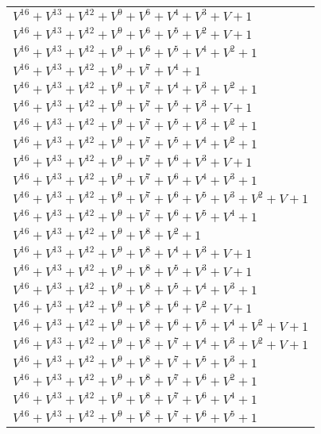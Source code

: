 \documentclass[12pt]{article}
\begin{document}
\begin{adjustwidth}{-4cm}{}
\begin{center}
\begin{longtable}{|l|}
$V^{16}  +V^{13}  +V^{12}  +V^{9}  +V^{6}  +V^{4}  +V^{3}  + V + 1$ \\
$V^{16}  +V^{13}  +V^{12}  +V^{9}  +V^{6}  +V^{5}  +V^{2}  + V + 1$ \\
$V^{16}  +V^{13}  +V^{12}  +V^{9}  +V^{6}  +V^{5}  +V^{4}  +V^{2}  + 1$ \\
$V^{16}  +V^{13}  +V^{12}  +V^{9}  +V^{7}  +V^{4}  + 1$ \\
$V^{16}  +V^{13}  +V^{12}  +V^{9}  +V^{7}  +V^{4}  +V^{3}  +V^{2}  + 1$ \\
$V^{16}  +V^{13}  +V^{12}  +V^{9}  +V^{7}  +V^{5}  +V^{3}  + V + 1$ \\
$V^{16}  +V^{13}  +V^{12}  +V^{9}  +V^{7}  +V^{5}  +V^{3}  +V^{2}  + 1$ \\
$V^{16}  +V^{13}  +V^{12}  +V^{9}  +V^{7}  +V^{5}  +V^{4}  +V^{2}  + 1$ \\
$V^{16}  +V^{13}  +V^{12}  +V^{9}  +V^{7}  +V^{6}  +V^{3}  + V + 1$ \\
$V^{16}  +V^{13}  +V^{12}  +V^{9}  +V^{7}  +V^{6}  +V^{4}  +V^{3}  + 1$ \\
$V^{16}  +V^{13}  +V^{12}  +V^{9}  +V^{7}  +V^{6}  +V^{5}  +V^{3}  +V^{2}  + V + 1$ \\
$V^{16}  +V^{13}  +V^{12}  +V^{9}  +V^{7}  +V^{6}  +V^{5}  +V^{4}  + 1$ \\
$V^{16}  +V^{13}  +V^{12}  +V^{9}  +V^{8}  +V^{2}  + 1$ \\
$V^{16}  +V^{13}  +V^{12}  +V^{9}  +V^{8}  +V^{4}  +V^{3}  + V + 1$ \\
$V^{16}  +V^{13}  +V^{12}  +V^{9}  +V^{8}  +V^{5}  +V^{3}  + V + 1$ \\
$V^{16}  +V^{13}  +V^{12}  +V^{9}  +V^{8}  +V^{5}  +V^{4}  +V^{3}  + 1$ \\
$V^{16}  +V^{13}  +V^{12}  +V^{9}  +V^{8}  +V^{6}  +V^{2}  + V + 1$ \\
$V^{16}  +V^{13}  +V^{12}  +V^{9}  +V^{8}  +V^{6}  +V^{5}  +V^{4}  +V^{2}  + V + 1$ \\
$V^{16}  +V^{13}  +V^{12}  +V^{9}  +V^{8}  +V^{7}  +V^{4}  +V^{3}  +V^{2}  + V + 1$ \\
$V^{16}  +V^{13}  +V^{12}  +V^{9}  +V^{8}  +V^{7}  +V^{5}  +V^{3}  + 1$ \\
$V^{16}  +V^{13}  +V^{12}  +V^{9}  +V^{8}  +V^{7}  +V^{6}  +V^{2}  + 1$ \\
$V^{16}  +V^{13}  +V^{12}  +V^{9}  +V^{8}  +V^{7}  +V^{6}  +V^{4}  + 1$ \\
$V^{16}  +V^{13}  +V^{12}  +V^{9}  +V^{8}  +V^{7}  +V^{6}  +V^{5}  + 1$ \\

\end{longtable}
\end{center}
\end{adjustwidth}
\end{document}
